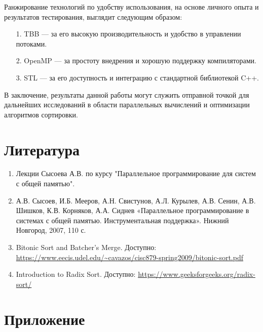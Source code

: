 \documentclass{report}
\begin{document}
\par Ранжирование технологий по удобству использования, на основе личного опыта и результатов тестирования, выглядит следующим образом:
\begin{itemize}
    \item[1.] TBB — за его высокую производительность и удобство в управлении потоками.
    \item[2.] OpenMP — за простоту внедрения и хорошую поддержку компиляторами.
    \item[3.] STL — за его доступность и интеграцию с стандартной библиотекой C++.
\end{itemize}

\par В заключение, результаты данной работы могут служить отправной точкой для дальнейших исследований в области параллельных вычислений и оптимизации алгоритмов сортировки.

\newpage

\section*{Литература}
\begin{enumerate}
    \item Лекции Сысоева А.В. по курсу "Параллельное программирование для систем с общей памятью".
    \item А.В. Сысоев, И.Б. Мееров, А.Н. Свистунов, А.Л. Курылев, А.В. Сенин, А.В. Шишков, К.В. Корняков, А.А. Сиднев «Параллельное программирование в системах с общей памятью. Инструментальная поддержка». Нижний Новгород, 2007, 110 с.
    \item Bitonic Sort and Batcher's Merge. Доступно: \url{https://www.eecis.udel.edu/~cavazos/cisc879-spring2009/bitonic-sort.pdf}
    \item Introduction to Radix Sort. Доступно: \url{https://www.geeksforgeeks.org/radix-sort/}
\end{enumerate}

\newpage

\section*{Приложение}
\end{document}
